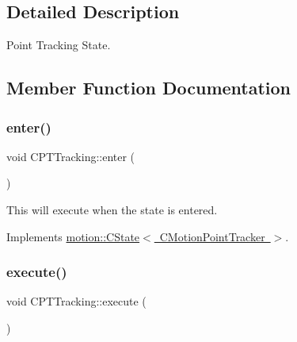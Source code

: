 \subsection{Detailed Description}
Point Tracking State. 

\subsection{Member Function Documentation}
\mbox{\label{classmotion_1_1CPTTracking_af2456aaf125ca9ba240463d1e259d4b9}} 
\subsubsection{\texorpdfstring{enter()}{enter()}}
{\footnotesize\ttfamily void C\+P\+T\+Tracking\+::enter (\begin{DoxyParamCaption}\item[{\mbox{\hyperlink{classmotion_1_1CMotionPointTracker}{C\+Motion\+Point\+Tracker}} $\ast$}]{ }\end{DoxyParamCaption})\hspace{0.3cm}{\ttfamily [virtual]}}

This will execute when the state is entered. 

Implements \mbox{\hyperlink{classmotion_1_1CState_a53d5fcfec223b58ccdd364a8430fd23c}{motion\+::\+C\+State$<$ C\+Motion\+Point\+Tracker $>$}}.

\mbox{\label{classmotion_1_1CPTTracking_aa8f85da75436cc8d98c25318b0bea42d}} 
\subsubsection{\texorpdfstring{execute()}{execute()}}
{\footnotesize\ttfamily void C\+P\+T\+Tracking\+::execute (\begin{DoxyParamCaption}\item[{\mbox{\hyperlink{classmotion_1_1CMotionPointTracker}{C\+Motion\+Point\+Tracker}} $\ast$}]{ }\end{DoxyParamCaption})\hspace{0.3cm}{\ttfamily [virtual]}}

